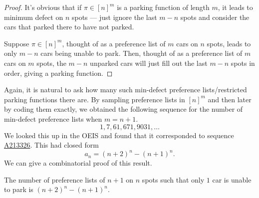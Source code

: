 \begin{proof}
    It's obvious that if $\pi \in [n]^m$ is a parking function of length $m$, it leads to minimum defect on $n$ spots --- just ignore the last $m - n$ spots and consider the cars that parked there to have not parked.
    
    Suppose $\pi \in [n]^m$, thought of as a preference list of $m$ cars on $n$ spots, leads to only $m - n$ cars being unable to park. Then, thought of as a preference list of $m$ cars on $m$ spots, the $m - n$ unparked cars will just fill out the last $m - n$ spots in order, giving a parking function.
\end{proof}

Again, it is natural to ask how many such min-defect preference lists/restricted parking functions there are. By sampling preference lists in $[n]^m$ and then later by coding them exactly, we obtained the following sequence for the number of min-defect preference lists when $m = n + 1$.
\[
1, 7, 61, 671, 9031, \dots
\]
We looked this up in the OEIS and found that it corresponded to sequence \href{https://oeis.org/A213326}{A213326}. This had closed form
\[
a_n = (n + 2)^{n} - (n + 1)^n.
\]
We can give a combinatorial proof of this result.

\begin{proposition}
    The number of preference lists of $n + 1$ on $n$ spots such that only $1$ car is unable to park is $(n + 2)^n - (n + 1)^n$.
\end{proposition}

